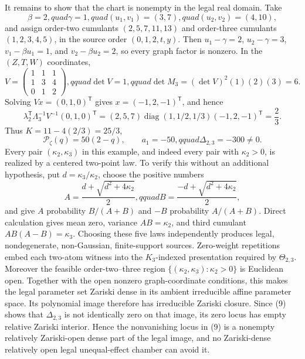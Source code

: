 It remains to show that the chart is nonempty in the legal real domain.  Take
\[
 \beta=2,quad\gamma=1,quad (u_1,v_1)=(3,7),quad (u_2,v_2)=(4,10),
\]
and assign order-two cumulants \((2,5,7,11,13)\) and order-three cumulants \((1,2,3,4,5)\), in the source order \((0,1,2,t,y)\).  Then \(u_1-\gamma=2\), \(u_2-\gamma=3\), \(v_1-\beta u_1=1\), and \(v_2-\beta u_2=2\), so every graph factor is nonzero.  In the \((Z,T,W)\) coordinates,
\[
 V=\begin{pmatrix}1&1&1\\1&3&4\\0&1&2\end{pmatrix},qquad
 \det V=1,qquad \det M_3=(\det V)^2(1)(2)(3)=6.
\]
Solving \(Vx=(0,1,0)^{\mathsf T}\) gives \(x=(-1,2,-1)^{\mathsf T}\), and hence
\[
 \lambda_2^{\mathsf T}\Lambda_3^{-1}V^{-1}(0,1,0)^{\mathsf T}
 =(2,5,7)\operatorname{diag}(1,1/2,1/3)(-1,2,-1)^{\mathsf T}
 =\frac23.
\]
Thus \(K=11-4(2/3)=25/3\),
\[
 \mathcal P_\zeta(q)=50(2-q),\qquad a_1=-50,qquad
 \Delta_{2,3}=-300\ne0. \tag{9}
\]
Every pair \((\kappa_2,\kappa_3)\) in this example, and indeed every pair with \(\kappa_2>0\), is realized by a centered two-point law.  To verify this without an additional hypothesis, put \(d=\kappa_3/\kappa_2\), choose the positive numbers
\[
 A=\frac{d+\sqrt{d^2+4\kappa_2}}2,qquad
 B=\frac{-d+\sqrt{d^2+4\kappa_2}}2,
\]
and give \(A\) probability \(B/(A+B)\) and \(-B\) probability \(A/(A+B)\).  Direct calculation gives mean zero, variance \(AB=\kappa_2\), and third cumulant \(AB(A-B)=\kappa_3\).  Choosing these five laws independently produces legal, nondegenerate, non-Gaussian, finite-support sources.  Zero-weight repetitions embed each two-atom witness into the \(K_3\)-indexed presentation required by \(\Theta_{2,3}\).  Moreover the feasible order-two--three region \(\{(\kappa_2,\kappa_3):\kappa_2>0\}\) is Euclidean open.  Together with the open nonzero graph-coordinate conditions, this makes the legal parameter set Zariski dense in its ambient irreducible affine parameter space.  Its polynomial image therefore has irreducible Zariski closure.  Since (9) shows that \(\Delta_{2,3}\) is not identically zero on that image, its zero locus has empty relative Zariski interior.  Hence the nonvanishing locus in (9) is a nonempty relatively Zariski-open dense part of the legal image, and no Zariski-dense relatively open legal unequal-effect chamber can avoid it.

